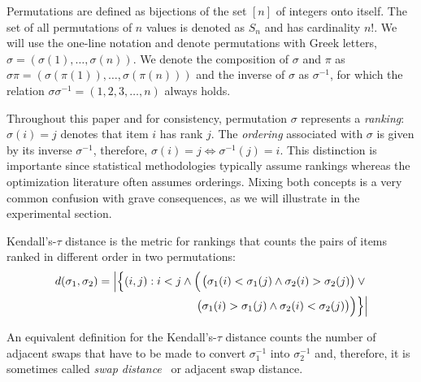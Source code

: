 \documentclass[sigconf,dvipsnames]{acmart}
\newcommand{\ken}{Kendall's-$\tau$\xspace}
\begin{document}
Permutations are defined as bijections of the set $[n]$ of integers onto itself. The set of all permutations of $n$ values is denoted as $S_n$ and has cardinality $n!$. We will use the one-line notation
and denote permutations with Greek letters, $\sigma  = (\sigma(1), \ldots , \sigma(n))$. We denote the composition of $\sigma$ and $\pi$ as $\sigma\pi = (\sigma(\pi(1)), \ldots, \sigma(\pi(n)))$
and the inverse of $\sigma$ as $\sigma^{-1}$, for which the relation $\sigma\sigma^{-1}=(1, 2, 3, \dotsc,n)$ always holds.

Throughout this paper and for consistency, permutation $\sigma$ represents a \emph{ranking}:  $\sigma(i)=j$ denotes that item $i$ has rank $j$. The \emph{ordering} associated with $\sigma$ is given by its inverse $\sigma^{-1}$, therefore,  $\sigma(i)=j \Leftrightarrow  \sigma^{-1}(j)=i$. This distinction is importante since statistical methodologies typically assume rankings whereas the optimization literature often assumes orderings. Mixing both concepts is a very common confusion with grave consequences, as we will illustrate in the experimental section.

\ken distance is the metric for rankings that counts the pairs of items ranked in different order in two permutations:
%
\begin{equation}\label{eq:kendall_decomp}
\begin{split}
\hspace*{-0.5em}d(\sigma _{1},\sigma_{2})=\left\lvert\Bigl\{(i,j):i<j \land \phantom{}\Bigl(\right.&\bigl(\sigma_{1}(i) < \sigma_{1}(j)\land \sigma_{2}(i)>\sigma_{2}(j)\bigr)\lor \phantom{} \\
 \bigl(&\sigma_{1}(i)>\sigma_{1}(j)\land \sigma_{2}(i)<\sigma_{2}(j)\bigr)\Bigr)\Bigr\}\Bigr\rvert\\
 \end{split}\hspace*{-0.6em}
 \end{equation}

An equivalent definition for the \ken distance counts the number of adjacent swaps that have to be made to convert $\sigma_1^{-1}$ into $\sigma_2^{-1}$ and, therefore, it is sometimes called \emph{swap distance}~\citep{ZaeStoBar2014:ppsn} or adjacent swap distance. %
\end{document}
